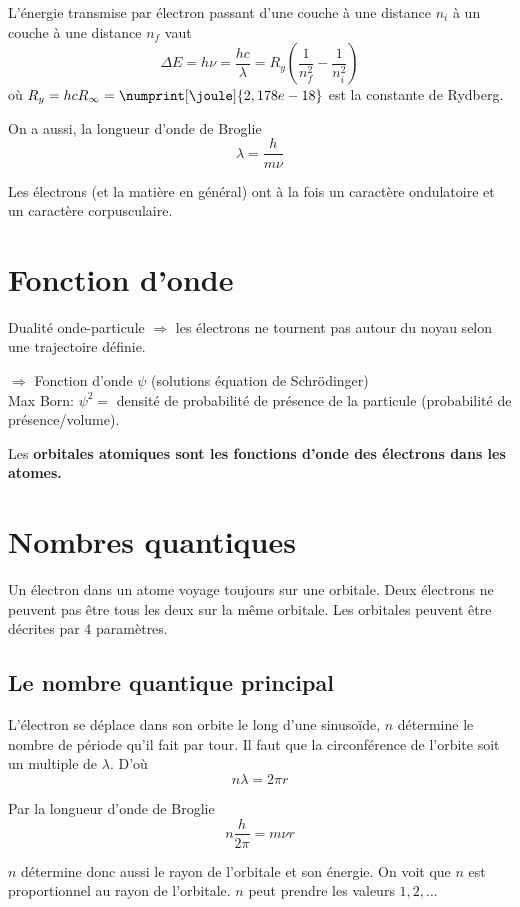 \documentclass[11pt,a4paper,french]{article}
\renewcommand{\textbf}[1]{\begingroup\bfseries\mathversion{bold}#1\endgroup}
\begin{document}
L'énergie transmise par électron passant d'une couche à une distance $n_i$ à un couche à une distance $n_f$ vaut
\[ \Delta E = h\nu = \frac{hc}{\lambda} = R_y \left( \frac{1}{n_f^2} - \frac{1}{n_i^2} \right) \]
où $R_y = hc R_\infty = \numprint[\joule]{2,178e-18}$ est la constante de Rydberg.

On a aussi, la longueur d'onde de Broglie
\[ \lambda = \frac{h}{m\nu} \]

Les électrons (et la matière en général) ont à la fois un caractère ondulatoire et un caractère corpusculaire.


\section{Fonction d'onde}

Dualité onde-particule $\Rightarrow$ les électrons ne tournent pas autour du noyau selon une trajectoire définie.

$\Rightarrow$ Fonction d'onde $\psi$ (solutions équation de Schrödinger)\\

Max Born: $\psi^2 = $ densité de probabilité de présence de la particule (probabilité de présence/volume).

Les \textbf{orbitales atomiques} sont les fonctions d'onde des électrons dans les atomes.

\section{Nombres quantiques}

Un électron dans un atome voyage toujours sur une orbitale.
Deux électrons ne peuvent pas être tous les deux sur la même orbitale.
Les orbitales peuvent être décrites par 4 paramètres.

\subsection{Le nombre quantique principal}
L'électron se déplace dans son orbite le long d'une sinusoïde, $n$ détermine le nombre de période qu'il fait par tour.
Il faut que la circonférence de l'orbite soit un multiple de $\lambda$.
D'où
\[ n\lambda = 2\pi r \]

Par la longueur d'onde de Broglie
\[ n \frac{h}{2\pi} = m \nu r \]

$n$ détermine donc aussi le rayon de l'orbitale et son énergie.
On voit que $n$ est proportionnel au rayon de l'orbitale.
$n$ peut prendre les valeurs $1, 2, \ldots$
\end{document}
